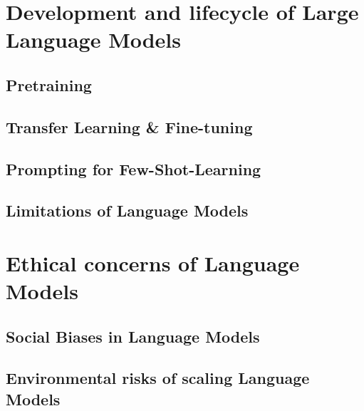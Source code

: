 \section{Development and lifecycle of Large Language Models}
\label{sec:nlp:app}

\subsection{Pretraining}
\label{sec:nlp:pre}

\subsection{Transfer Learning \& Fine-tuning}
\label{sec:nlp:transfer}

\subsection{Prompting for Few-Shot-Learning}
\label{sec:nlp:prompt}

\subsection{Limitations of Language Models}
\label{sec:nlp:limits}

\section{Ethical concerns of Language Models}
\label{sec:nlp:ethic}

\subsection{Social Biases in Language Models}
\label{sec:nlp:social}

\subsection{Environmental risks of scaling Language Models}
\label{sec:nlp:environment}

